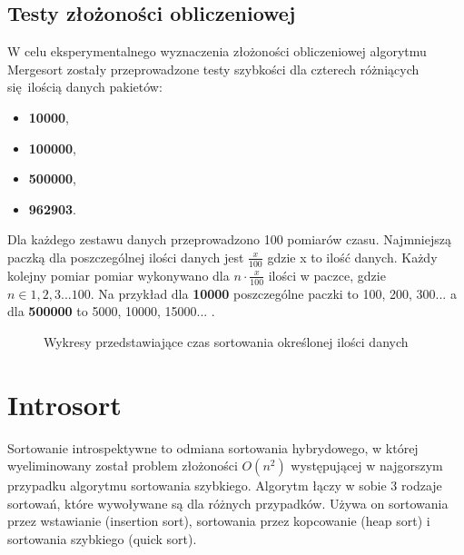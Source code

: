 \documentclass[12pt]{article}
\begin{document}
\subsection{Testy złożoności obliczeniowej}
W celu eksperymentalnego wyznaczenia złożoności obliczeniowej algorytmu Mergesort zostały przeprowadzone testy szybkości dla 
czterech różniących się ilością danych pakietów: 
\begin{itemize}
       \item \textbf{10000},
       \item  \textbf{100000},
       \item \textbf{500000},
       \item \textbf{962903}.
\end{itemize}
Dla każdego zestawu danych przeprowadzono 100 pomiarów czasu. Najmniejszą paczką dla poszczególnej ilości danych jest 
$\frac{x}{100}$ gdzie x to ilość danych. Każdy kolejny pomiar pomiar wykonywano dla $n \cdot \frac{x}{100}$ ilości w paczce,
gdzie $n \in 1,2,3 ... 100$.
Na przykład dla \textbf{10000} poszczególne paczki to 100, 200, 300... a dla \textbf{500000} to 5000, 10000, 15000... .

\begin{figure}[H]
       \centering
       \quad
\end{figure}
\begin{figure}[H]\ContinuedFloat
       
       \quad
       \renewcommand{\figurename}{Wykres.}
       \caption{Wykresy przedstawiające czas sortowania określonej ilości danych}
       \label{fig: mergesort}
\end{figure}


\section{Introsort}\label{ch: introsort}
Sortowanie introspektywne to odmiana sortowania hybrydowego, w której wyeliminowany został
problem złożoności $O(n^2)$ występującej w najgorszym przypadku algorytmu sortowania szybkiego.
Algorytm łączy w sobie 3 rodzaje sortowań, które wywoływane są dla różnych przypadków.
Używa on sortowania przez wstawianie (insertion sort), sortowania przez kopcowanie (heap sort)
i sortowania szybkiego (quick sort).
\end{document}

